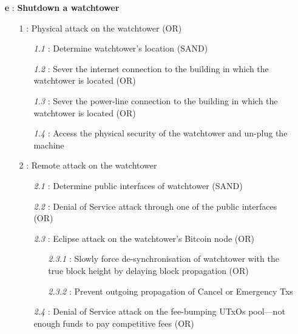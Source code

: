 \documentclass[runningheads]{llncs}
\begin{document}
{\footnotesize
\begin{itemize}[noitemsep,parsep=0pt,partopsep=0pt, leftmargin=0.7cm]
\item[\textbf{e} :] \textbf{Shutdown a watchtower}
\begin{itemize}[noitemsep,topsep=0pt,parsep=0pt,partopsep=0pt, leftmargin=0.8cm]
\item[1 :] Physical attack on the watchtower (OR)
\begin{itemize}[noitemsep,topsep=0pt,parsep=0pt,partopsep=0pt, leftmargin=0.9cm]
\item[\textit{1.1} :] Determine watchtower's location (SAND)
\item[\textit{1.2} :] Sever the internet connection to the building in which the watchtower is located (OR)
\item[\textit{1.3} :] Sever the power-line connection to the building in which the watchtower is located (OR)
\item[\textit{1.4} :] Access the physical security of the watchtower and un-plug the machine
\end{itemize}
\item[2 :] Remote attack on the watchtower
\begin{itemize}[noitemsep,topsep=0pt,parsep=0pt,partopsep=0pt, leftmargin=0.9cm]
\item[\textit{2.1} :] Determine public interfaces of watchtower (SAND)
\item[\textit{2.2} :] Denial of Service attack through one of the public interfaces (OR)
\item[\textit{2.3} :] Eclipse attack on the watchtower's Bitcoin node \cite{EclipseAttack} (OR)
\begin{itemize}[noitemsep,topsep=0pt,parsep=0pt,partopsep=0pt, leftmargin=1cm]
\item[\textit{2.3.1} :] Slowly force de-synchronisation of watchtower with the true block height by delaying block propagation \cite{TimeDilationAttack} (OR)
\item[\textit{2.3.2} :] Prevent outgoing propagation of Cancel or Emergency Txs
\end{itemize}
\item[\textit{2.4} :] Denial of Service attack on the fee-bumping UTxOs pool---not enough funds to pay competitive fees (OR)
\end{itemize}
\end{itemize}
\end{itemize}
}
\end{document}
